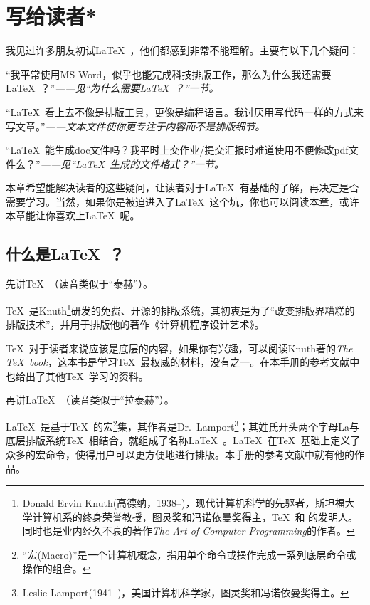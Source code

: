 \chapter{\mbox{写给读者}*}

我见过许多朋友初试\LaTeX\ ，他们都感到非常不能理解。主要有以下几个疑问：
\begin{feae}
\item “我平常使用MS Word，似乎也能完成科技排版工作，那么为什么我还需要\LaTeX\ ？”\hfill \textit{——见“为什么需要\LaTeX\ ？”一节。}
\item “\LaTeX\ 看上去不像是排版工具，更像是编程语言。我讨厌用写代码一样的方式来写文章。”\hfill \textit{——文本文件使你更专注于内容而不是排版细节。}
\item “\LaTeX\ 能生成doc文件吗？我平时上交作业/提交汇报时难道使用不便修改pdf文件么？”\hfill \textit{——见“\LaTeX\ 生成的文件格式？”一节。}
\end{feae}

本章希望能解决读者的这些疑问，让读者对于\LaTeX\ 有基础的了解，再决定是否需要学习。当然，如果你是被迫进入了\LaTeX\ 这个坑，你也可以阅读本章，或许本章能让你喜欢上\LaTeX\ 呢。

\section{什么是\LaTeX\ ？}
先讲\TeX\ （读音类似于“泰赫”）。

\TeX\ 是Knuth\footnote{Donald Ervin Knuth(高德纳，1938--)，现代计算机科学的先驱者，斯坦福大学计算机系的终身荣誉教授，图灵奖和冯诺依曼奖得主，\TeX\ 和  的发明人。同时也是业内经久不衰的著作\emph{The Art of Computer Programming}的作者。}研发的免费、开源的排版系统，其初衷是为了“改变排版界糟糕的排版技术”，并用于排版他的著作《计算机程序设计艺术》。

\TeX\ 对于读者来说应该是底层的内容，如果你有兴趣，可以阅读Knuth著的\emph{The \TeX\ book}，这本书是学习\TeX\ 最权威的材料，没有之一。在本手册的参考文献中也给出了其他\TeX\ 学习的资料。\dpar

再讲\LaTeX\ （读音类似于“拉泰赫”）。

\LaTeX\ 是基于\TeX\ 的宏\footnote{“宏(Macro)”是一个计算机概念，指用单个命令或操作完成一系列底层命令或操作的组合。}集，其作者是Dr.~Lamport\footnote{Leslie Lamport(1941--)，美国计算机科学家，图灵奖和冯诺依曼奖得主。}；其姓氏开头两个字母La与底层排版系统\TeX\ 相结合，就组成了名称\LaTeX\ 。\LaTeX\ 在\TeX\ 基础上定义了众多的宏命令，使得用户可以更方便地进行排版。本手册的参考文献中就有他的作品。

